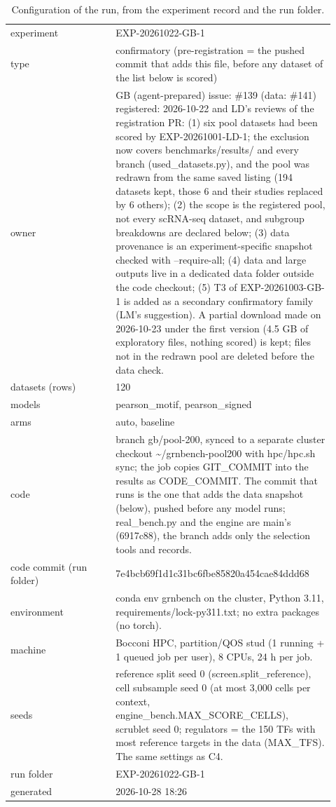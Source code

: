 \begin{table}[H]\centering\small
\caption{Configuration of the run, from the experiment record and the run folder.}
\begin{tabular}{p{0.3\linewidth}p{0.62\linewidth}}\toprule
experiment & EXP-20261022-GB-1 \\
type & confirmatory (pre-registration = the pushed commit that adds this file, before any dataset of the list below is scored) \\
owner & GB (agent-prepared)   issue: \#139 (data: \#141)   registered: 2026-10-22 and LD's reviews of the registration PR: (1) six pool datasets had been scored by EXP-20261001-LD-1; the exclusion now covers benchmarks/results/ and every branch (used\_datasets.py), and the pool was redrawn from the same saved listing (194 datasets kept, those 6 and their studies replaced by 6 others); (2) the scope is the registered pool, not every scRNA-seq dataset, and subgroup breakdowns are declared below; (3) data provenance is an experiment-specific snapshot checked with --require-all; (4) data and large outputs live in a dedicated data folder outside the code checkout; (5) T3 of EXP-20261003-GB-1 is added as a secondary confirmatory family (LM's suggestion). A partial download made on 2026-10-23 under the first version (4.5 GB of exploratory files, nothing scored) is kept; files not in the redrawn pool are deleted before the data check. \\
datasets (rows) & 120 \\
models & pearson\_motif, pearson\_signed \\
arms & auto, baseline \\
code & branch gb/pool-200, synced to a separate cluster checkout \textasciitilde{}/grnbench-pool200 with hpc/hpc.sh sync; the job copies GIT\_COMMIT into the results as CODE\_COMMIT. The commit that runs is the one that adds the data snapshot (below), pushed before any model runs; real\_bench.py and the engine are main's (6917c88), the branch adds only the selection tools and records. \\
code commit (run folder) & 7e4bcb69f1d1c31bc6fbe85820a454cae84ddd68 \\
environment & conda env grnbench on the cluster, Python 3.11, requirements/lock-py311.txt; no extra packages (no torch). \\
machine & Bocconi HPC, partition/QOS stud (1 running + 1 queued job per user), 8 CPUs, 24 h per job. \\
seeds & reference split seed 0 (screen.split\_reference), cell subsample seed 0 (at most 3,000 cells per context, engine\_bench.MAX\_SCORE\_CELLS), scrublet seed 0; regulators = the 150 TFs with most reference targets in the data (MAX\_TFS). The same settings as C4. \\
run folder & EXP-20261022-GB-1 \\
generated & 2026-10-28 18:26 \\
\bottomrule\end{tabular}\end{table}
